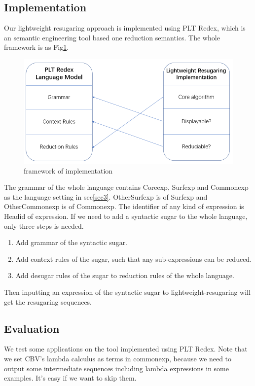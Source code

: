 \subsection{Implementation}

Our lightweight resugaring approach  is implemented using PLT Redex\cite{SEwPR}, which is an semantic engineering tool based one reduction semantics\cite{reduction}. The whole framework is as Fig\ref{fig:frame}.

\begin{figure}[h]
	\centering
	\includegraphics[width=12cm]{images/frame.png}
	\caption{framework of implementation}
	\label{fig:frame}
\end{figure}

The grammar of the whole language contains Coreexp, Surfexp and Commonexp as the language setting in sec\ref{sec3}. OtherSurfexp is of Surfexp and OtherCommonexp is of Commonexp. The identifier of any kind of expression is Headid of expression. If we need to add a syntactic sugar to the whole language, only three steps is needed.

\begin{enumerate}
\item Add grammar of the syntactic sugar.
\item Add context rules of the sugar, such that any sub-expressions can be reduced.
\item Add desugar rules of the sugar to reduction rules of the whole language.
\end{enumerate}

Then inputting an expression of the syntactic sugar to lightweight-resugaring will get the resugaring sequences.

\subsection{Evaluation}

We test some applications on the tool implemented using PLT Redex. Note that we set CBV's lambda calculus as terms in commonexp, because we need to output some intermediate sequences including lambda expressions in some examples. It's easy if we want to skip them.


